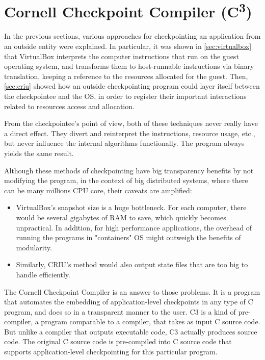 \section{Cornell Checkpoint Compiler (C\textsuperscript{3})}\label{sec:c3}
In the previous sections, various approaches for checkpointing an application from an outside entity were explained. In particular, it was shown in \autoref{sec:virtualbox} that VirtualBox interprets the computer instructions that run on the guest operating system, and transforms them to host-runnable instructions via binary translation, keeping a reference to the resources allocated for the guest. 
Then, \autoref{sec:criu} showed how an outside checkpointing program could layer itself between the checkpointee and the OS, in order to register their important interactions related to resources access and allocation. 

From the checkpointee's point of view, both of these techniques never really have a direct effect. They divert and reinterpret the instructions, resource usage, etc., but never influence the internal algorithms functionally. The program always yields the same result.

Although these methods of checkpointing have big transparency benefits by not modifying the program, in the context of big distributed systems, where there can be many millions CPU core, their caveats are amplified:
\begin{itemize}
	\item VirtualBox's snapshot size is a huge bottleneck. For each computer, there would be several gigabytes of RAM to save, which quickly becomes unpractical. In addition, for high performance applications, the overhead of running the programs in "containers" OS might outweigh the benefits of modularity.
	\item Similarly, CRIU's method would also output state files that are too big to handle efficiently. 
\end{itemize} 

The Cornell Checkpoint Compiler is an answer to those problems. It is a program that automates the embedding of application-level checkpoints in any type of C program, and does so in a transparent manner to the user. C3 is a kind of pre-compiler, a program comparable to a compiler, that takes as input C source code. But unlike a compiler that outputs executable code, C3 actually produces source code. The original C source code is pre-compiled into C source code that supports application-level checkpointing for this particular program\cite{report:bronevetsky}.

